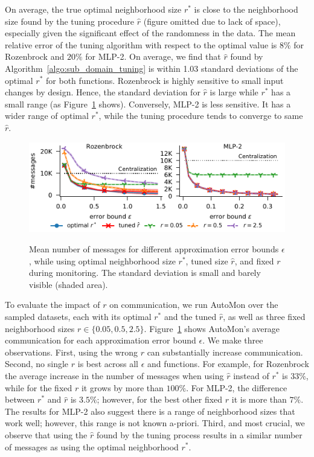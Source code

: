 On average, the true optimal neighborhood size $r^*$ is close to the neighborhood size found by the tuning procedure $\hat{r}$ (figure omitted due to lack of space), especially given the significant effect of the randomness in the data.
The mean relative error of the tuning algorithm with respect to the optimal value is $8\%$ for Rozenbrock and $20\%$ for MLP-2.
On average, we find that $\hat{r}$ found by Algorithm~\ref{algo:sub_domain_tuning} is within 1.03 standard deviations of the optimal $r^*$ for both functions.
Rozenbrock is highly sensitive to small input changes by design.
Hence, the standard deviation for $\hat{r}$ is large while $r^*$ has a small range (as Figure~\ref{fig:neighborhood_impact_on_communication_error_bound_connection} shows).
Conversely, MLP-2 is less sensitive. 
It has a wider range of optimal $r^*$, while the tuning procedure tends to converge to same $\hat{r}$.


\begin{figure}
	\centering
	{\label{sub_fig:neighborhood_impact_on_communication_error_bound_connection}\includegraphics[width=1.0\columnwidth]{figures/neighborhood_impact_on_communication_error_bound_connection.pdf}}
	\caption{
		Mean number of messages for different approximation error bounds $\epsilon$, while using optimal neighborhood size $r^*$, tuned size $\hat{r}$, and fixed $r$ during monitoring.
		The standard deviation is small and barely visible (shaded area).
	}
	\label{fig:neighborhood_impact_on_communication_error_bound_connection}
\end{figure}


To evaluate the impact of $r$ on communication,
we run AutoMon over the sampled datasets, each with its optimal $r^*$ and the tuned $\hat{r}$, as well as three fixed neighborhood sizes $r \in \{0.05, 0.5, 2.5\}$.
Figure~\ref{fig:neighborhood_impact_on_communication_error_bound_connection} shows AutoMon's average communication for each approximation error bound $\epsilon$.
We make three observations.
First, using the wrong $r$ can substantially increase communication.
Second, no single $r$ is best across all $\epsilon$ and functions.
For example, for Rozenbrock the average increase in the number of messages when using $\hat{r}$  instead of $r^*$ is $33\%$, while for the fixed $r$ it grows by more than $100\%$.
For MLP-2, the difference between $r^*$ and $\hat{r}$ is $3.5\%$; however, for the best other fixed $r$ it is more than $7\%$.
The results for MLP-2 also suggest there is a range of neighborhood sizes that work well; however, this range is not known a-priori.
Third, and most crucial, we observe that using the $\hat{r}$ found by the tuning process results in a similar number of messages as using the optimal neighborhood  $r^{*}$.



